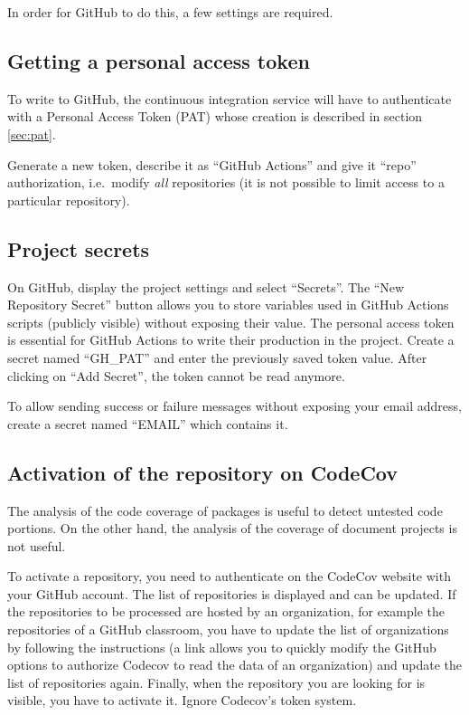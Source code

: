 \documentclass[
  12pt,
  american,
  a4paper,
  extrafontsizes,onecolumn,openright
  ]{memoir}
\begin{document}
In order for GitHub to do this, a few settings are required.

\hypertarget{getting-a-personal-access-token}{%
\subsection{Getting a personal access token}\label{getting-a-personal-access-token}}

To write to GitHub, the continuous integration service will have to authenticate with a Personal Access Token (PAT) whose creation is described in section \ref{sec:pat}.

Generate a new token, describe it as \enquote{GitHub Actions} and give it \enquote{repo} authorization, i.e.~modify \emph{all} repositories (it is not possible to limit access to a particular repository).

\hypertarget{sec:secrets-ci}{%
\subsection{Project secrets}\label{sec:secrets-ci}}

On GitHub, display the project settings and select \enquote{Secrets}.
The \enquote{New Repository Secret} button allows you to store variables used in GitHub Actions scripts (publicly visible) without exposing their value.
The personal access token is essential for GitHub Actions to write their production in the project.
Create a secret named \enquote{GH\_PAT} and enter the previously saved token value.
After clicking on \enquote{Add Secret}, the token cannot be read anymore.

To allow sending success or failure messages without exposing your email address, create a secret named \enquote{EMAIL} which contains it.

\hypertarget{activation-of-the-repository-on-codecov}{%
\subsection{Activation of the repository on CodeCov}\label{activation-of-the-repository-on-codecov}}

The analysis of the code coverage of packages is useful to detect untested code portions.
On the other hand, the analysis of the coverage of document projects is not useful.

To activate a repository, you need to authenticate on the CodeCov website with your GitHub account.
The list of repositories is displayed and can be updated.
If the repositories to be processed are hosted by an organization, for example the repositories of a GitHub classroom, you have to update the list of organizations by following the instructions (a link allows you to quickly modify the GitHub options to authorize Codecov to read the data of an organization) and update the list of repositories again.
Finally, when the repository you are looking for is visible, you have to activate it.
Ignore Codecov's token system.
\end{document}
